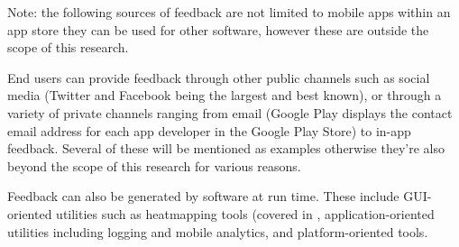 Note: the following sources of feedback are not limited to mobile apps within an app store they can be used for other software, however these are outside the scope of this research.

End users can provide feedback through other public channels such as social media (Twitter and Facebook being the largest and best known), or through a variety of private channels ranging from email (Google Play displays the contact email address for each app developer in the Google Play Store) to in-app feedback. Several of these will be mentioned as examples otherwise they're also beyond the scope of this research for various reasons. 

Feedback can also be generated by software at run time. These include GUI-oriented utilities such as heatmapping tools (covered in , application-oriented utilities including logging and mobile analytics, and platform-oriented tools.




